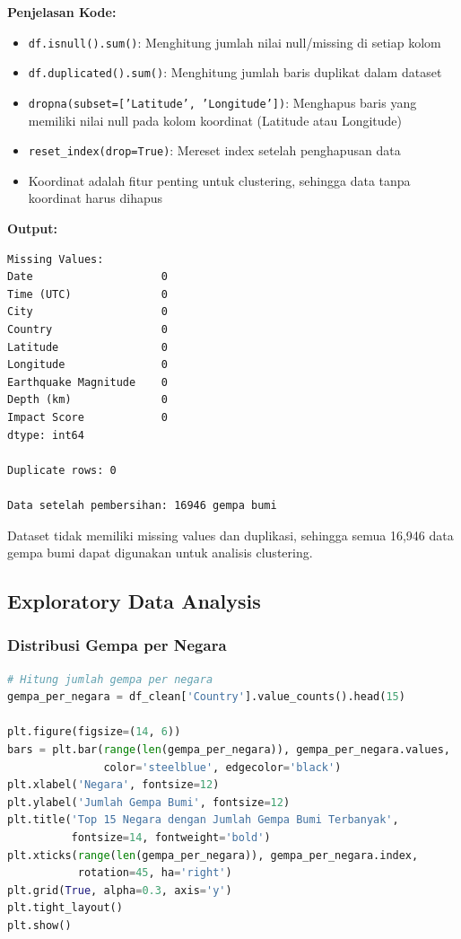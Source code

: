 \documentclass[12pt,a4paper]{article}
\begin{document}
\textbf{Penjelasan Kode:}
\begin{itemize}
    \item \texttt{df.isnull().sum()}: Menghitung jumlah nilai null/missing di setiap kolom
    \item \texttt{df.duplicated().sum()}: Menghitung jumlah baris duplikat dalam dataset
    \item \texttt{dropna(subset=['Latitude', 'Longitude'])}: Menghapus baris yang memiliki nilai null pada kolom koordinat (Latitude atau Longitude)
    \item \texttt{reset\_index(drop=True)}: Mereset index setelah penghapusan data
    \item Koordinat adalah fitur penting untuk clustering, sehingga data tanpa koordinat harus dihapus
\end{itemize}

\textbf{Output:}
\begin{verbatim}
Missing Values:
Date                    0
Time (UTC)              0
City                    0
Country                 0
Latitude                0
Longitude               0
Earthquake Magnitude    0
Depth (km)              0
Impact Score            0
dtype: int64

Duplicate rows: 0

Data setelah pembersihan: 16946 gempa bumi
\end{verbatim}

Dataset tidak memiliki missing values dan duplikasi, sehingga semua 16,946 data gempa bumi dapat digunakan untuk analisis clustering.

\subsection{Exploratory Data Analysis}

\subsubsection{Distribusi Gempa per Negara}

\begin{lstlisting}[language=Python, caption=Visualisasi Distribusi Gempa per Negara]
# Hitung jumlah gempa per negara
gempa_per_negara = df_clean['Country'].value_counts().head(15)

plt.figure(figsize=(14, 6))
bars = plt.bar(range(len(gempa_per_negara)), gempa_per_negara.values, 
               color='steelblue', edgecolor='black')
plt.xlabel('Negara', fontsize=12)
plt.ylabel('Jumlah Gempa Bumi', fontsize=12)
plt.title('Top 15 Negara dengan Jumlah Gempa Bumi Terbanyak', 
          fontsize=14, fontweight='bold')
plt.xticks(range(len(gempa_per_negara)), gempa_per_negara.index, 
           rotation=45, ha='right')
plt.grid(True, alpha=0.3, axis='y')
plt.tight_layout()
plt.show()
\end{lstlisting}
\end{document}
